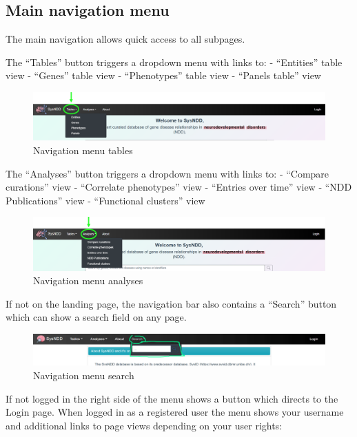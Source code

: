 \documentclass[
]{article}
\begin{document}
\hypertarget{main-navigation-menu}{%
\subsection{Main navigation menu}\label{main-navigation-menu}}

The main navigation allows quick access to all subpages.

The ``Tables'' button triggers a dropdown menu with links to:
- ``Entities'' table view
- ``Genes'' table view
- ``Phenotypes'' table view
- ``Panels table'' view

\begin{figure}
\centering
\includegraphics{./static/img/02_02-navigation-menu-tables.png}
\caption{Navigation menu tables}
\end{figure}

The ``Analyses'' button triggers a dropdown menu with links to:
- ``Compare curations'' view
- ``Correlate phenotypes'' view
- ``Entries over time'' view
- ``NDD Publications'' view
- ``Functional clusters'' view

\begin{figure}
\centering
\includegraphics{./static/img/02_03-navigation-menu-analyses.png}
\caption{Navigation menu analyses}
\end{figure}

If not on the landing page, the navigation bar also contains a ``Search'' button which can show a search field on any page.

\begin{figure}
\centering
\includegraphics{./static/img/02_04-navigation-menu-search.png}
\caption{Navigation menu search}
\end{figure}

If not logged in the right side of the menu shows a button which directs to the Login page.
When logged in as a registered user the menu shows your username and additional links to page views depending on your user rights:
\end{document}
